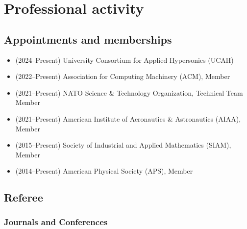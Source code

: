 % 

\section{Professional activity}

\subsection{Appointments and memberships}

\begin{itemize}
    \item (2024--Present) University Consortium for Applied Hypersonics (UCAH)
    \item (2022--Present) Association for Computing Machinery (ACM), Member
    \item (2021--Present) NATO Science \& Technology Organization, Technical Team Member
    \item (2021--Present) American Institute of Aeronautics \& Astronautics (AIAA), Member
    \item (2015--Present) Society of Industrial and Applied Mathematics (SIAM), Member
    \item (2014--Present) American Physical Society (APS), Member
\end{itemize}

\subsection{Referee}

\subsubsection{Journals and Conferences}

